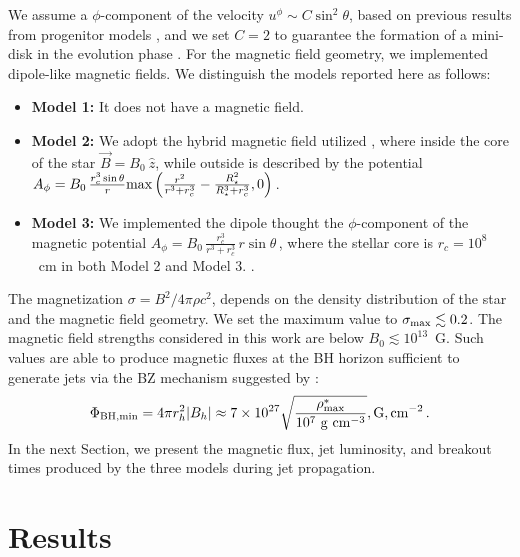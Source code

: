 \documentclass{ptapap}
\begin{document}
We assume a $\phi$-component of the velocity $u^\phi \sim C \sin^2\theta$, based on previous results from progenitor models \citep[e.g.,][]{WoosleyHeger_2006}, and we set $C = 2$ to guarantee the formation of a mini-disk in the evolution phase \citep{Murguiaberthier2020}. For the magnetic field geometry, we implemented dipole-like magnetic fields. We distinguish the models reported here as follows:
%
\begin{itemize}
    \item \textbf{Model 1:} It does not have a magnetic field.
    \item \textbf{Model 2:} We adopt the hybrid magnetic field utilized \citet{gottlieb2022a}, where inside the core of the star $\vec{B}=B_0~\hat{z}$, while outside is described by the potential $A_\phi=B_0\,\frac{r_c^3\sin\theta}{r} {\rm max}\left(\frac{r^2}{r^3+r_c^3}-\frac{R_\star^2}{R_\star^3+r_c^3},0 \right)\,$.
    \item \textbf{Model 3:} We implemented the dipole thought the $\phi$-component of the magnetic potential $A_\phi = B_0\, \frac{r_c^3}{r^3 + r_c^3}\, r \sin \theta\,$, where the stellar core is $r_c=10^8$~cm in both Model 2 and Model 3. \citep[See, ][]{Moesta2014,magnetorotational1}.
\end{itemize}
%
The magnetization $\sigma = B^2 / 4\pi \rho c^2$, depends on the density distribution of the star and the magnetic field geometry. We set the maximum value to $\sigma_{\rm max} \lesssim 0.2$. The magnetic field strengths considered in this work are below $B_0 \lesssim 10^{13}$~G. Such values are able to produce magnetic fluxes at the BH horizon sufficient to generate jets via the BZ mechanism suggested by \citet{Burrows_2007,KomissarovBarkov2009,gottlieb2022a}:
%
\begin{equation}
\Phi_{\rm BH,min} = 4 \pi r_h^2 |B_h| \approx 7 \times 10^{27}
\sqrt{\frac{\rho_{\rm max}^*}{10^7~{\rm g}~{\rm cm}^{-3}}}
,{\rm G},{\rm cm}^{-2}\,.
\label{eqn:mag_condition}
\end{equation}
%
In the next Section, we present the magnetic flux, jet luminosity, and breakout times produced by the three models during jet propagation.


\section{Results}
\end{document}
